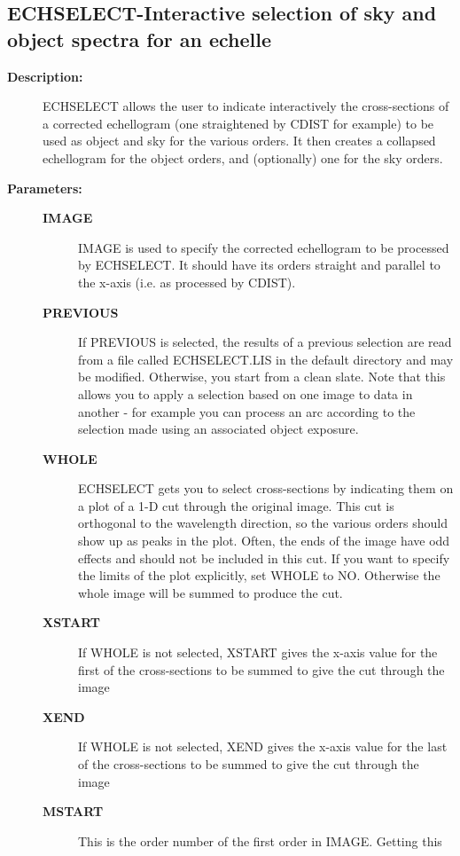 \subsection{ECHSELECT-\label{ECHSELECT}Interactive selection of sky and object spectra for an echelle}
\begin{description}

\item [{\bf Description:}]
 ECHSELECT allows the user to indicate interactively the cross-sections
 of a corrected echellogram (one straightened by CDIST for example) to
 be used as object and sky for the various orders.  It then creates a
 collapsed echellogram for the object orders, and (optionally) one for
 the sky orders.

\item [{\bf Parameters:}]
\begin{description}
\item [{\bf IMAGE}]
 IMAGE is used to specify the corrected echellogram to be processed by
 ECHSELECT.  It should have its orders straight and parallel to the
 x-axis (i.e. as processed by CDIST).
\item [{\bf PREVIOUS}]
 If PREVIOUS is selected, the results of a previous selection are read
 from a file called ECHSELECT.LIS in the default directory and may be
 modified.  Otherwise, you start from a clean slate.  Note that this
 allows you to apply a selection based on one image to data in another
 - for example you can process an arc according to the selection made
 using an associated object exposure.
\item [{\bf WHOLE}]
 ECHSELECT gets you to select cross-sections by indicating them on a
 plot of a 1-D cut through the original image.  This cut is orthogonal
 to the wavelength direction, so the various orders should show up as
 peaks in the plot.  Often, the ends of the image have odd effects and
 should not be included in this cut.  If you want to specify the
 limits of the plot explicitly, set WHOLE to NO. Otherwise the whole
 image will be summed to produce the cut.
\item [{\bf XSTART}]
 If WHOLE is not selected, XSTART gives the x-axis value for the first
 of the cross-sections to be summed to give the cut through the image
\item [{\bf XEND}]
 If WHOLE is not selected, XEND gives the x-axis value for the last of
 the cross-sections to be summed to give the cut through the image
\item [{\bf MSTART}]
 This is the order number of the first order in IMAGE. Getting this

\end{description}
\end{description}

